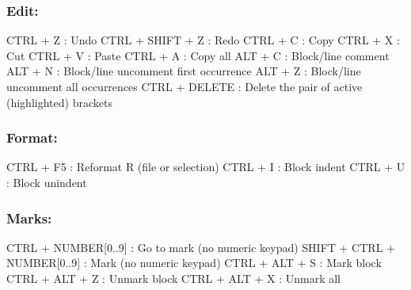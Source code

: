 \subsubsection{Edit:}

\vspace{-0.5cm}
\begin{Rtables}[caption={[Edit menu keyboard shortcuts]
    Edit menu keyboard shortcuts},
  label=menu:edit]
  CTRL + Z         : Undo
  CTRL + SHIFT + Z : Redo
  CTRL + C         : Copy
  CTRL + X         : Cut
  CTRL + V         : Paste
  CTRL + A         : Copy all
  ALT  + C         : Block/line comment
  ALT  + N         : Block/line uncomment first occurrence
  ALT  + Z         : Block/line uncomment all occurrences
  CTRL + DELETE    : Delete the pair of active (highlighted) brackets
\end{Rtables}


\newpage
\subsubsection{Format:}

\vspace{-0.5cm}
\begin{Rtables}[caption={[Format menu keyboard shortcuts]
    Format menu keyboard shortcuts},
  label=menu:format]
  CTRL + F5 : Reformat R (file or selection)
  CTRL + I  : Block indent
  CTRL + U  : Block unindent
\end{Rtables}


\subsubsection{Marks:}

\vspace{-0.5cm}
\begin{Rtables}[caption={[Marks menu keyboard shortcuts]
    Marks menu keyboard shortcuts},
  label=menu:marks]
  CTRL  + NUMBER[0..9]        : Go to mark (no numeric keypad)
  SHIFT + CTRL + NUMBER[0..9] : Mark (no numeric keypad)
  CTRL  + ALT  + S            : Mark block
  CTRL  + ALT  + Z            : Unmark block
  CTRL  + ALT  + X            : Unmark all
\end{Rtables}



